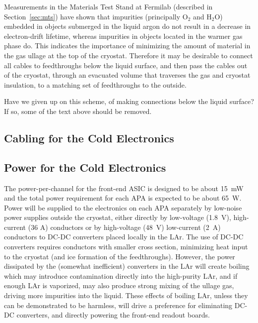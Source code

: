 Measurements in the Materials Test Stand at Fermilab (described in Section~\ref{sec:mts})
have shown that impurities (principally O$_2$ and H$_2$O) embedded in objects submerged in the liquid argon do not result
in a decrease in electron-drift lifetime, whereas impurities in objects located in the warmer gas phase do.
This indicates the importance of minimizing the amount of material in the gas ullage at the top of the cryostat.
Therefore it may be desirable to connect all cables to feedthroughs below the liquid surface,
and then pass the cables out of the cryostat, through an evacuated volume that traverses the gas and cryostat insulation,
to a matching set of feedthroughs to the outside. 

\begin{editornote}
  Have we given up on this scheme, of making connections below the liquid surface?
  If so, some of the text above should be removed.
\end{editornote}

%
\subsection{Cabling for the Cold Electronics }
\label{subsec:ce-feedthrough-cable}

%
\subsection{Power for the Cold Electronics }
\label{subsec:ce-feedthrough-power}

The power-per-channel for the front-end ASIC is designed to be about 15~mW and
the total power requirement for each APA is expected to be about 65~W.
Power will be supplied to the electronics on each APA separately by low-noise
power supplies outside the cryostat, either directly by
low-voltage (1.8~V), high-current (36 A) conductors or by high-voltage (48~V)
low-current (2~A) conductors to DC-DC converters placed locally in the LAr.
The use of DC-DC converters requires conductors with smaller cross section,
minimizing heat input to the cryostat (and ice formation of the feedthroughs).
However, the power dissipated by the (somewhat inefficient) converters in
the LAr will create boiling which may introduce contamination directly into the 
high-purity LAr, and if enough LAr is vaporized, may also produce strong mixing of the
ullage gas, driving more impurities into the liquid.
These effects of boiling LAr, unless they can be demonstrated to be harmless,
will drive a preference for eliminating DC-DC converters, and directly powering the front-end readout boards.

